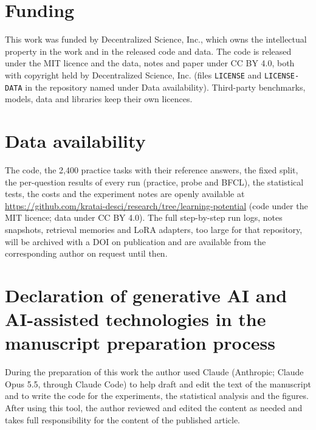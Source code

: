 \documentclass[a4paper,fleqn]{cas-dc}
\begin{document}
\section*{Funding}
This work was funded by Decentralized Science, Inc., which owns the intellectual property in the work and in the
released code and data. The code is released under the MIT licence and the data, notes and paper under CC BY 4.0, both
with copyright held by Decentralized Science, Inc. (files \texttt{LICENSE} and \texttt{LICENSE-DATA} in the repository
named under Data availability). Third-party benchmarks, models, data and libraries keep their own licences.

\section*{Data availability}
The code, the 2,400 practice tasks with their reference answers, the fixed split, the per-question results of every
run (practice, probe and BFCL), the statistical tests, the costs and the experiment notes are openly available at
\url{https://github.com/kratai-desci/research/tree/learning-potential} (code under the MIT licence; data under CC BY 4.0). The full step-by-step run logs, notes snapshots,
retrieval memories and LoRA adapters, too large for that repository, will be archived with a DOI on publication and
are available from the corresponding author on request until then.

\section*{Declaration of generative AI and AI-assisted technologies in the manuscript preparation process}
During the preparation of this work the author used Claude (Anthropic; Claude Opus 5.5, through Claude Code) to help
draft and edit the text of the manuscript and to write the code for the experiments, the statistical analysis and the
figures. After using this tool, the author reviewed and edited the content as
needed and takes full responsibility for the content of the published article.



\end{document}
